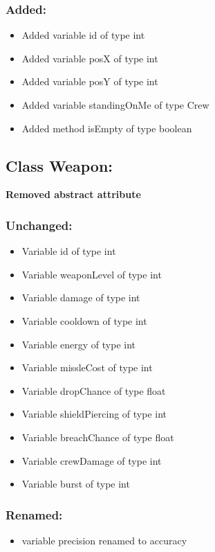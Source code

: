 \documentclass{article}
\begin{document}
\subsubsection{Added:}
\begin{itemize}
\item Added variable id of type int
\item Added variable posX of type int
\item Added variable posY of type int
\item Added variable standingOnMe of type Crew
\item Added method isEmpty of type boolean
\end{itemize}


\subsection{Class Weapon:}

\textbf{Removed abstract attribute}

\subsubsection{Unchanged:}
\begin{itemize}
\item Variable id of type int
\item Variable weaponLevel of type int
\item Variable damage of type int
\item Variable cooldown of type int
\item Variable energy of type int
\item Variable missleCost of type int
\item Variable dropChance of type float
\item Variable shieldPiercing of type int
\item Variable breachChance of type float
\item Variable crewDamage of type int
\item Variable burst of type int
\end{itemize}

\subsubsection{Renamed:}
\begin{itemize}
\item variable precision renamed to accuracy
\end{itemize}
\end{document}
